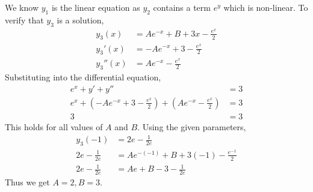\documentclass{article}
\begin{document}
We know $y_1$ is the linear equation as $y_2$ contains a term $e^y$ which is non-linear. To verify that $y_3$ is a solution,
\begin{align*}
y_3(x) &= Ae^{-x} + B + 3x - \frac{e^x}{2}
\\ y_3'(x) &= -Ae^{-x} + 3 - \frac{e^x}{2}
\\ y_3''(x) &= Ae^{-x} - \frac{e^x}{2}
\end{align*}
Substituting into the differential equation,
\begin{align*}
e^x + y' + y'' &= 3
\\ e^x + (-Ae^{-x} + 3 - \frac{e^x}{2}) + (Ae^{-x} - \frac{e^x}{2}) &= 3
\\ 3 &= 3
\end{align*}
This holds for all values of $A$ and $B$. Using the given parameters,
\begin{align*}
y_3(-1) &= 2e - \frac{1}{2e}
\\ 2e - \frac{1}{2e} &= Ae^{-(-1)} + B + 3(-1) - \frac{e^{-1}}{2}
\\ 2e - \frac{1}{2e} &= Ae + B - 3 - \frac{1}{2e}
\end{align*}
Thus we get $A = 2, B = 3$.
\end{document}
